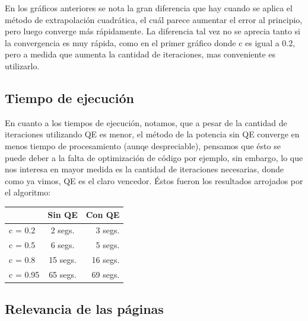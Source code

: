 En los gr\'aficos anteriores se nota la gran diferencia que hay cuando se aplica el m\'etodo de extrapolaci\'on cuadr\'atica, el cu\'al parece aumentar el error al principio, pero luego converge m\'as r\'apidamente. La diferencia tal vez no se aprecia tanto si la convergencia es muy r\'apida, como en el primer gr\'afico donde c es igual a 0.2, pero a medida que aumenta la cantidad de iteraciones, mas conveniente es utilizarlo.\\


\subsection{Tiempo de ejecuci\'on}

En cuanto a los tiempos de ejecuci\'on, notamos, que a pesar de la cantidad de iteraciones utilizando QE es menor, el m\'etodo de la potencia sin QE converge en menos tiempo de procesamiento (aunqe despreciable), pensamos que \'esto se puede deber a la falta de optimizaci\'on de c\'odigo por ejemplo, sin embargo, lo que nos interesa en mayor medida es la cantidad de iteraciones necesarias, donde como ya vimos, QE es el claro vencedor. 
\'Estos fueron los resultados arrojados por el algoritmo: \\

\begin{tabular}{ l | c | r}
  & Sin QE & Con QE\\
  \hline
  c = 0.2 & 2 segs. & 3 segs.\\
  \hline
  c = 0.5 & 6 segs. & 5 segs.\\
  \hline
  c = 0.8 & 15 segs. & 16 segs. \\
  \hline
  c = 0.95 & 65 segs. & 69 segs. \\
  \hline
\end{tabular}


\subsection{Relevancia de las p\'aginas}

